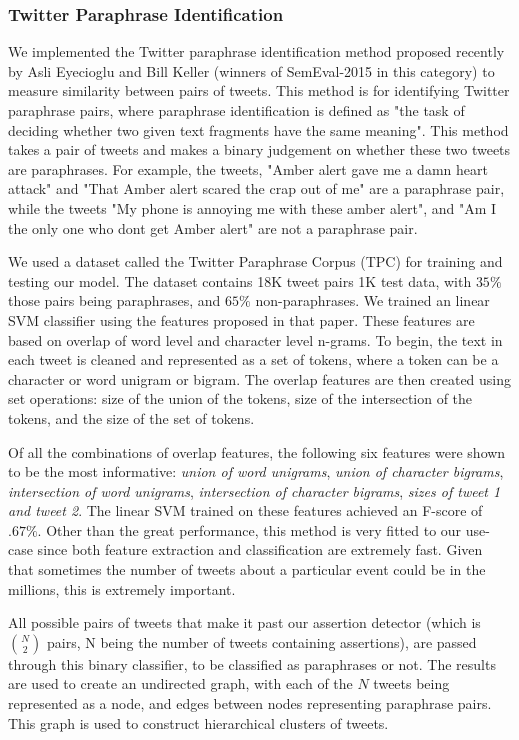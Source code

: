 \documentclass[letterpaper]{article}
\begin{document}
\subsubsection{Twitter Paraphrase Identification}
We implemented the Twitter paraphrase identification method proposed recently by Asli Eyecioglu and Bill Keller \cite{eyecioglu2015asobek} (winners of SemEval-2015 in this category) to measure similarity between pairs of tweets. 
This method is for identifying Twitter paraphrase pairs, where paraphrase identification is defined as "the task of deciding whether two given text fragments have the same meaning". This method takes a pair of tweets and makes a binary judgement on whether these two tweets are paraphrases. For example, the tweets, "Amber alert gave me a damn heart attack" and "That Amber alert scared the crap out of me" are a paraphrase pair, while the tweets "My phone is annoying me with these amber alert", and "Am I the only one who dont get Amber alert" are not a paraphrase pair.

We used a dataset called the Twitter Paraphrase Corpus (TPC) \cite{xu2014extracting} for training and testing our model. The dataset contains 18K tweet pairs 1K test data, with $35\%$ those pairs being paraphrases, and $65\%$ non-paraphrases. We trained an linear SVM classifier using the features proposed in that paper. These features are based on overlap of word level and character level n-grams. To begin, the text in each tweet is cleaned and represented as a set of tokens, where a token can be a character or word unigram or bigram. The overlap features are then created using set operations: size of the union of the tokens, size of the intersection of the tokens, and the size of the set of tokens.

Of all the combinations of overlap features, the following six features were shown to be the most informative: \emph{union of word unigrams}, \emph{union of character bigrams}, \emph{intersection of word unigrams}, \emph{intersection of character bigrams}, \emph{sizes of tweet 1 and tweet 2}. The linear SVM trained on these features achieved an F-score of $.67\%$. Other than the great performance, this method is very fitted to our use-case since both feature extraction and classification are extremely fast. Given that sometimes the number of tweets about a particular event could be in the millions, this is extremely important.

All possible pairs of tweets that make it past our assertion detector (which is ${N  \choose 2}$ pairs, N being the number of tweets containing assertions), are passed through this binary classifier, to be classified as paraphrases or not. The results are used to create an undirected graph, with each of the $N$ tweets being represented as a node, and edges between nodes representing paraphrase pairs. This graph is used to construct hierarchical clusters of tweets.
\end{document}
